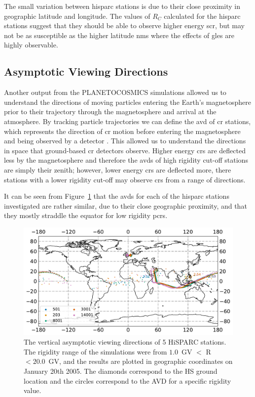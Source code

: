 The small variation between \gls{hisparc} stations is due to their close proximity in geographic latitude and longitude. The values of $R_C$ calculated for the \gls{hisparc} stations suggest that they should be able to observe higher energy \gls{scr}, but may not be as susceptible as the higher latitude \glspl{nm} where the effects of \glspl{gle} are highly observable.

\subsection{Asymptotic Viewing Directions}

Another output from the PLANETOCOSMICS simulations allowed us to understand the directions of moving particles entering the Earth's magnetosphere prior to their trajectory through the magnetosphere and arrival at the atmosphere. By tracking particle trajectories we can define the \gls{avd} of \gls{cr} stations, which represents the direction of \gls{cr} motion before entering the magnetosphere and being observed by a detector \citep{danilova_mapping_2019}. This allowed us to understand the directions in space that ground-based \gls{cr} detectors observe. Higher energy \glspl{cr} are deflected less by the magnetosphere and therefore the \glspl{avd} of high rigidity cut-off stations are simply their zenith; however, lower energy \glspl{cr} are deflected more, there stations with a lower rigidity cut-off may observe \glspl{cr} from a range of directions.

It can be seen from Figure~\ref{fig:HS_AVD} that the \glspl{avd} for each of the \gls{hisparc} stations investigated are rather similar, due to their close geographic proximity, and that they mostly straddle the equator for low rigidity \glspl{pcr}. 

\begin{figure}[ht!]
	\centering
	\includegraphics[scale=0.6]{HS_AVDs.pdf}
	\caption{The vertical asymptotic viewing directions of 5 HiSPARC stations. The rigidity range of the simulations were from $1.0$~GV $<$ R $<20.0$~GV, and the results are plotted in geographic coordinates on January 20th 2005. The diamonds correspond to the HS ground location and the circles correspond to the AVD for a specific rigidity value.}
	\label{fig:HS_AVD}
\end{figure}

